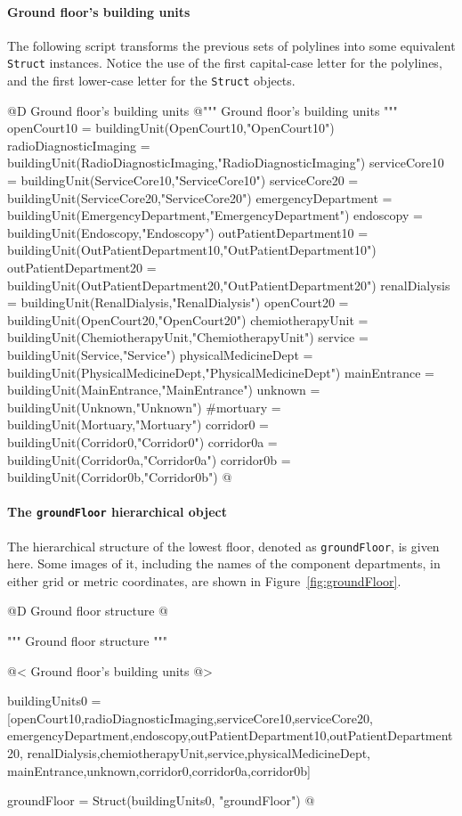 \documentclass[11pt,oneside]{article}    %
\begin{document}
\paragraph{Ground floor's building units}

The following script transforms the previous sets of polylines into some equivalent \texttt{Struct} instances.
Notice the use of the first capital-case letter for the polylines, and the first lower-case letter for the \texttt{Struct} objects.

@D Ground floor's building units 
@{""" Ground floor's building units """
openCourt10 = buildingUnit(OpenCourt10,"OpenCourt10")
radioDiagnosticImaging = buildingUnit(RadioDiagnosticImaging,"RadioDiagnosticImaging")
serviceCore10 = buildingUnit(ServiceCore10,"ServiceCore10")
serviceCore20 = buildingUnit(ServiceCore20,"ServiceCore20")
emergencyDepartment = buildingUnit(EmergencyDepartment,"EmergencyDepartment")
endoscopy = buildingUnit(Endoscopy,"Endoscopy")
outPatientDepartment10 = buildingUnit(OutPatientDepartment10,"OutPatientDepartment10")
outPatientDepartment20 = buildingUnit(OutPatientDepartment20,"OutPatientDepartment20")
renalDialysis = buildingUnit(RenalDialysis,"RenalDialysis")
openCourt20 = buildingUnit(OpenCourt20,"OpenCourt20")
chemiotherapyUnit = buildingUnit(ChemiotherapyUnit,"ChemiotherapyUnit")
service = buildingUnit(Service,"Service")
physicalMedicineDept = buildingUnit(PhysicalMedicineDept,"PhysicalMedicineDept")
mainEntrance = buildingUnit(MainEntrance,"MainEntrance")
unknown = buildingUnit(Unknown,"Unknown")
#mortuary = buildingUnit(Mortuary,"Mortuary")
corridor0 = buildingUnit(Corridor0,"Corridor0")
corridor0a = buildingUnit(Corridor0a,"Corridor0a")
corridor0b = buildingUnit(Corridor0b,"Corridor0b")
@}

\paragraph{The \texttt{groundFloor} hierarchical object}
The hierarchical structure of the lowest floor, denoted as \texttt{groundFloor}, is given here.
Some images of it, including the names of the component departments, in either grid or metric coordinates, are shown in Figure~\ref{fig:groundFloor}.

@D Ground floor structure
@{""" Ground floor structure """

@< Ground floor's building units @>

buildingUnits0 = [openCourt10,radioDiagnosticImaging,serviceCore10,serviceCore20,
    emergencyDepartment,endoscopy,outPatientDepartment10,outPatientDepartment20,
    renalDialysis,chemiotherapyUnit,service,physicalMedicineDept,
    mainEntrance,unknown,corridor0,corridor0a,corridor0b]
    
groundFloor = Struct(buildingUnits0, "groundFloor")
@}
\end{document}
